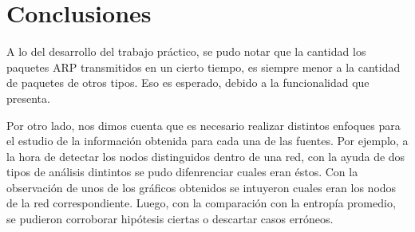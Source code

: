 \section{Conclusiones}

A lo del desarrollo del trabajo práctico, se pudo notar que la cantidad los paquetes ARP transmitidos en un cierto tiempo, es siempre menor a la cantidad de paquetes de otros tipos. Eso es esperado, debido a la funcionalidad que presenta.

Por otro lado, nos dimos cuenta que es necesario realizar distintos enfoques para el estudio de la información obtenida para cada una de las fuentes. Por ejemplo, a la hora de detectar los nodos distinguidos dentro de una red, con la ayuda de dos tipos de análisis dintintos se pudo difenrenciar cuales eran éstos. Con la observación de unos de los gráficos obtenidos se intuyeron cuales eran los nodos de la red correspondiente. Luego, con la comparación con la entropía promedio, se pudieron corroborar hipótesis ciertas o descartar casos erróneos.